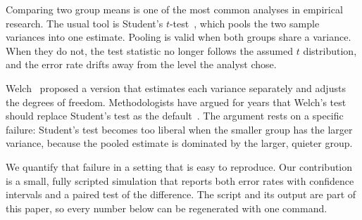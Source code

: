 Comparing two group means is one of the most common analyses in empirical research. The usual tool is Student's $t$-test~\citep{student1908probable}, which pools the two sample variances into one estimate. Pooling is valid when both groups share a variance. When they do not, the test statistic no longer follows the assumed $t$ distribution, and the error rate drifts away from the level the analyst chose.

Welch~\citep{welch1947generalization} proposed a version that estimates each variance separately and adjusts the degrees of freedom. Methodologists have argued for years that Welch's test should replace Student's test as the default~\citep{ruxton2006unequal, delacre2017why}. The argument rests on a specific failure: Student's test becomes too liberal when the smaller group has the larger variance, because the pooled estimate is dominated by the larger, quieter group.

We quantify that failure in a setting that is easy to reproduce. Our contribution is a small, fully scripted simulation that reports both error rates with confidence intervals and a paired test of the difference. The script and its output are part of this paper, so every number below can be regenerated with one command.
